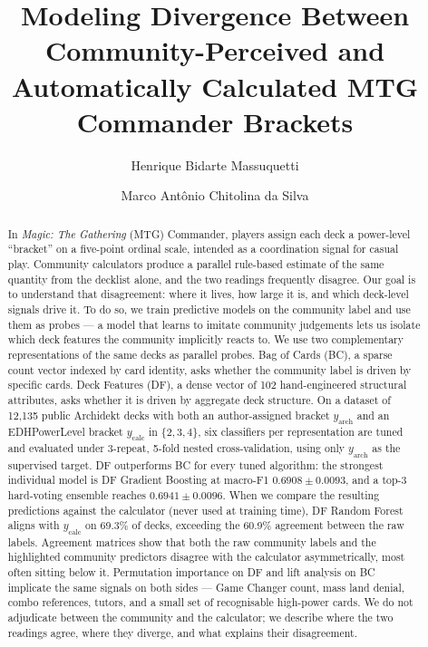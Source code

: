 \documentclass{article}
\title{
  Modeling Divergence Between Community-Perceived and\\
  Automatically Calculated MTG Commander Brackets
}
\author{
  Henrique Bidarte Massuquetti \and Marco Antônio Chitolina da Silva
}
\date{}
\begin{document}
\maketitle

\begin{abstract}
In \textit{Magic: The Gathering} (MTG) Commander, players assign each deck a power-level ``bracket'' on a five-point ordinal scale, intended as a coordination signal for casual play. Community calculators produce a parallel rule-based estimate of the same quantity from the decklist alone, and the two readings frequently disagree. Our goal is to understand that disagreement: where it lives, how large it is, and which deck-level signals drive it. To do so, we train predictive models on the community label and use them as probes --- a model that learns to imitate community judgements lets us isolate which deck features the community implicitly reacts to. We use two complementary representations of the same decks as parallel probes. Bag of Cards (BC), a sparse count vector indexed by card identity, asks whether the community label is driven by specific cards. Deck Features (DF), a dense vector of 102 hand-engineered structural attributes, asks whether it is driven by aggregate deck structure. On a dataset of 12{,}135 public Archidekt decks with both an author-assigned bracket \(y_{\text{arch}}\) and an EDHPowerLevel bracket \(y_{\text{calc}}\) in \(\{2,3,4\}\), six classifiers per representation are tuned and evaluated under 3-repeat, 5-fold nested cross-validation, using only \(y_{\text{arch}}\) as the supervised target. DF outperforms BC for every tuned algorithm: the strongest individual model is DF Gradient Boosting at macro-F1 \(0.6908 \pm 0.0093\), and a top-3 hard-voting ensemble reaches \(0.6941 \pm 0.0096\). When we compare the resulting predictions against the calculator (never used at training time), DF Random Forest aligns with \(y_{\text{calc}}\) on 69.3\% of decks, exceeding the 60.9\% agreement between the raw labels. Agreement matrices show that both the raw community labels and the highlighted community predictors disagree with the calculator asymmetrically, most often sitting below it. Permutation importance on DF and lift analysis on BC implicate the same signals on both sides --- Game Changer count, mass land denial, combo references, tutors, and a small set of recognisable high-power cards. We do not adjudicate between the community and the calculator; we describe where the two readings agree, where they diverge, and what explains their disagreement.

\end{abstract}
\end{document}
